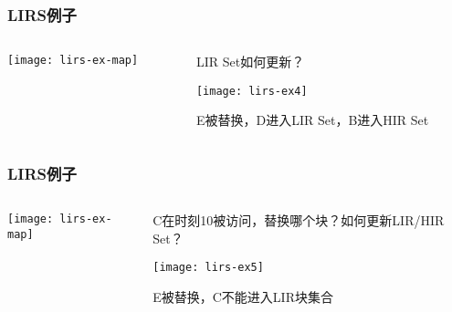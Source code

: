 \begin{frame}[plain]
	\frametitle{LIRS例子}
	\begin{columns}
		\begin{column}{.4\textwidth}
			\centering
			\texttt{[image: lirs-ex-map]}
		\end{column}
		
		\begin{column}{.6\textwidth}
			LIR Set如何更新？
			
			\texttt{[image: lirs-ex4]}
			
			E被替换，D进入LIR Set，B进入HIR Set 
		\end{column}
		
		
	\end{columns}
\end{frame}


\begin{frame}[plain]
	\frametitle{LIRS例子}
	\begin{columns}
		\begin{column}{.4\textwidth}
			\centering
			\texttt{[image: lirs-ex-map]}
		\end{column}
		
		\begin{column}{.6\textwidth}
			C在时刻10被访问，替换哪个块？如何更新LIR/HIR Set？
			
			\texttt{[image: lirs-ex5]}
			
			\pause
			\centering
			E被替换，C不能进入LIR块集合 
		\end{column}
		
		
	\end{columns}
\end{frame}


